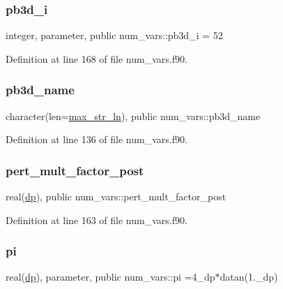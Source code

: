 \subsubsection{\texorpdfstring{pb3d\+\_\+i}{pb3d\_i}}
{\footnotesize\ttfamily integer, parameter, public num\+\_\+vars\+::pb3d\+\_\+i = 52}



Definition at line 168 of file num\+\_\+vars.\+f90.

\mbox{\label{namespacenum__vars_a8b3ab3b12cddc0c3e60c3430912b5f3c}} 
\subsubsection{\texorpdfstring{pb3d\+\_\+name}{pb3d\_name}}
{\footnotesize\ttfamily character(len=\hyperlink{namespacenum__vars_a3ff2bb983ee80a6735277d6789e6ce7c}{max\+\_\+str\+\_\+ln}), public num\+\_\+vars\+::pb3d\+\_\+name}



Definition at line 136 of file num\+\_\+vars.\+f90.

\mbox{\label{namespacenum__vars_aa53d6f71e297c4d8be05907bb7dbffce}} 
\subsubsection{\texorpdfstring{pert\+\_\+mult\+\_\+factor\+\_\+post}{pert\_mult\_factor\_post}}
{\footnotesize\ttfamily real(\hyperlink{namespacenum__vars_a03802aa2bd86439d7a9370836fabf3f2}{dp}), public num\+\_\+vars\+::pert\+\_\+mult\+\_\+factor\+\_\+post}



Definition at line 163 of file num\+\_\+vars.\+f90.

\mbox{\label{namespacenum__vars_a26f47310576a3414135b3d3fcc079709}} 
\subsubsection{\texorpdfstring{pi}{pi}}
{\footnotesize\ttfamily real(\hyperlink{namespacenum__vars_a03802aa2bd86439d7a9370836fabf3f2}{dp}), parameter, public num\+\_\+vars\+::pi =4\+\_\+dp$\ast$datan(1.\+\_\+dp)}



